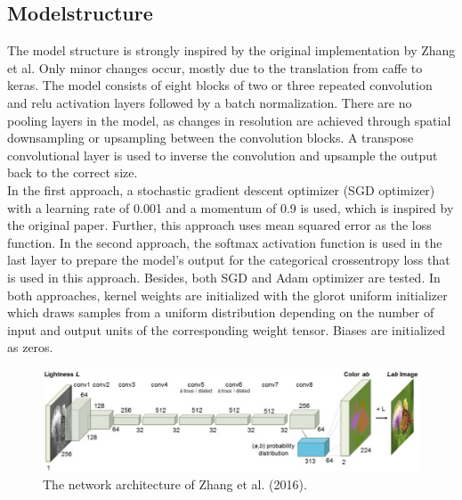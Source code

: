 \documentclass[12pt,letterpaper]{article}
\begin{document}
\subsection{Modelstructure}
The model structure is strongly inspired by the original implementation by Zhang et al. Only minor changes occur, mostly due to the translation from caffe to keras. The model consists of eight blocks of two or three repeated convolution and relu activation layers followed by a batch normalization. There are no pooling layers in the model, as changes  in  resolution  are  achieved  through  spatial  downsampling  or  upsampling between the convolution blocks. A transpose convolutional layer is used to inverse the convolution and upsample the output back to the correct size.\\
In the first approach, a stochastic gradient descent optimizer (SGD optimizer) with a learning rate of 0.001 and a momentum of 0.9 is used, which is inspired by the original paper. Further, this approach uses mean squared error as the loss function. In the second approach, the softmax activation function is used in the last layer to prepare the model's output for the categorical crossentropy loss that is used in this approach. Besides, both SGD and Adam optimizer are tested. In both approaches, kernel weights are initialized with the glorot uniform initializer which draws samples from a uniform distribution depending on the number of input and output units of the corresponding weight tensor. Biases are initialized as zeros.\\
\begin{figure}[ht]
	\centering
	\includegraphics[width=1.0\textwidth]{layer.png}
	\caption{The network architecture of Zhang et al. (2016). }
	\label{fig1}
\end{figure}
\end{document}
